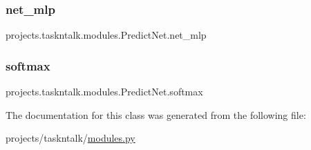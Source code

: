 \subsubsection{\texorpdfstring{net\+\_\+mlp}{net\_mlp}}
{\footnotesize\ttfamily projects.\+taskntalk.\+modules.\+Predict\+Net.\+net\+\_\+mlp}

\mbox{\label{classprojects_1_1taskntalk_1_1modules_1_1PredictNet_ade00e095f7c5b6a29284e514d7aaaf44}} 
\subsubsection{\texorpdfstring{softmax}{softmax}}
{\footnotesize\ttfamily projects.\+taskntalk.\+modules.\+Predict\+Net.\+softmax}



The documentation for this class was generated from the following file\+:\begin{DoxyCompactItemize}
\item 
projects/taskntalk/\hyperlink{projects_2taskntalk_2modules_8py}{modules.\+py}\end{DoxyCompactItemize}
